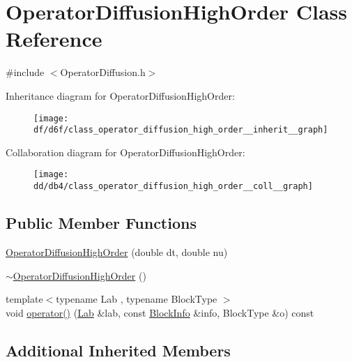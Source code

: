 \hypertarget{class_operator_diffusion_high_order}{}\section{Operator\+Diffusion\+High\+Order Class Reference}
\label{class_operator_diffusion_high_order}


{\ttfamily \#include $<$Operator\+Diffusion.\+h$>$}



Inheritance diagram for Operator\+Diffusion\+High\+Order\+:\nopagebreak
\begin{figure}[H]
\begin{center}
\leavevmode
\texttt{[image: df/d6f/class\_operator\_diffusion\_high\_order\_\_inherit\_\_graph]}
\end{center}
\end{figure}


Collaboration diagram for Operator\+Diffusion\+High\+Order\+:\nopagebreak
\begin{figure}[H]
\begin{center}
\leavevmode
\texttt{[image: dd/db4/class\_operator\_diffusion\_high\_order\_\_coll\_\_graph]}
\end{center}
\end{figure}
\subsection*{Public Member Functions}
\begin{DoxyCompactItemize}
\item 
\hyperlink{class_operator_diffusion_high_order_a086a3d39e9059f2b480b5919b0ed86dc}{Operator\+Diffusion\+High\+Order} (double dt, double nu)
\item 
\hyperlink{class_operator_diffusion_high_order_a33d1f96c66825ec4265e4eacd6759f06}{$\sim$\+Operator\+Diffusion\+High\+Order} ()
\item 
{\footnotesize template$<$typename Lab , typename Block\+Type $>$ }\\void \hyperlink{class_operator_diffusion_high_order_a27d274d97e6dffaf9babb2822f7eeb35}{operator()} (\hyperlink{_definitions_8h_ad6f951af9a2a6ebc1975404882b34314}{Lab} \&lab, const \hyperlink{struct_block_info}{Block\+Info} \&info, Block\+Type \&o) const 
\end{DoxyCompactItemize}
\subsection*{Additional Inherited Members}


